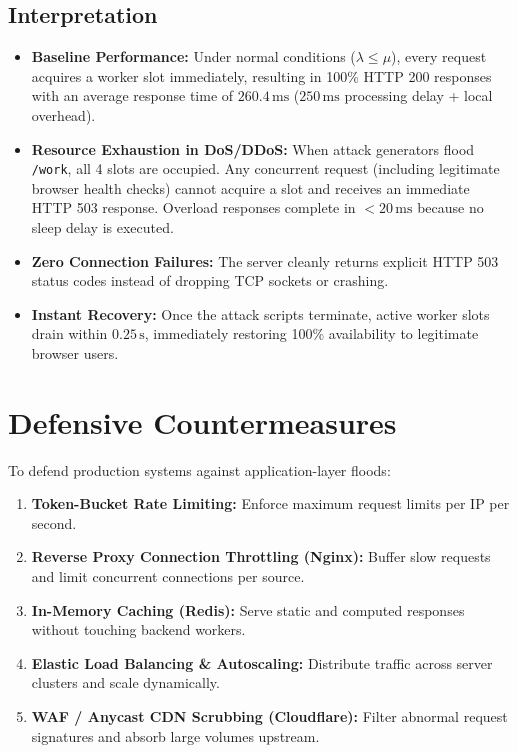 \documentclass[11pt,a4paper]{article}
\begin{document}
\subsection{Interpretation}
\begin{itemize}[leftmargin=*]
    \item \textbf{Baseline Performance:} Under normal conditions ($\lambda \le \mu$), every request acquires a worker slot immediately, resulting in 100\% HTTP 200 responses with an average response time of $260.4\,\text{ms}$ ($250\,\text{ms}$ processing delay + local overhead).
    \item \textbf{Resource Exhaustion in DoS/DDoS:} When attack generators flood \texttt{/work}, all 4 slots are occupied. Any concurrent request (including legitimate browser health checks) cannot acquire a slot and receives an immediate HTTP 503 response. Overload responses complete in $<20\,\text{ms}$ because no sleep delay is executed.
    \item \textbf{Zero Connection Failures:} The server cleanly returns explicit HTTP 503 status codes instead of dropping TCP sockets or crashing.
    \item \textbf{Instant Recovery:} Once the attack scripts terminate, active worker slots drain within $0.25\,\text{s}$, immediately restoring 100\% availability to legitimate browser users.
\end{itemize}

\section{Defensive Countermeasures}
To defend production systems against application-layer floods:
\begin{enumerate}[leftmargin=*]
    \item \textbf{Token-Bucket Rate Limiting:} Enforce maximum request limits per IP per second.
    \item \textbf{Reverse Proxy Connection Throttling (Nginx):} Buffer slow requests and limit concurrent connections per source.
    \item \textbf{In-Memory Caching (Redis):} Serve static and computed responses without touching backend workers.
    \item \textbf{Elastic Load Balancing \& Autoscaling:} Distribute traffic across server clusters and scale dynamically.
    \item \textbf{WAF / Anycast CDN Scrubbing (Cloudflare):} Filter abnormal request signatures and absorb large volumes upstream.
\end{enumerate}
\end{document}

